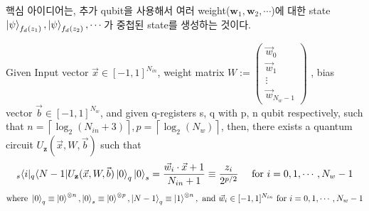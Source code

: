 핵심 아이디어는, 추가 qubit을 사용해서 여러 weight($\mathbf{w}_1, \mathbf{w}_2, \cdots$)에 대한 state \( \ket{\psi}_{f_d(z_1)}, \ket{\psi}_{f_d(z_2)}, \cdots \)가 중첩된 state를 생성하는 것이다.

\begin{lemma}
Given Input vector \( \vec{x} \in [-1, 1]^{N_{in}} \), weight matrix \( W:= \begin{pmatrix}
    \vec{w}_0 \\ \vec{w}_1 \\ \vdots \\ \vec{w}_{N_w - 1}
\end{pmatrix} \) , bias vector \( \vec{b} \in [-1, 1]^{N_w} \), and given q-registers s, q with p, n qubit respectively, such that \( n = \left\lceil \log_2(N_{in} + 3) \right\rceil, p = \left\lceil \log_2(N_w) \right\rceil \), then, there exists a quantum circuit \( U_{\mathbf z}(\vec{x}, W, \vec{b}) \) such that
\[
    {}_{s}\langle{i}| {}_{q}\langle N-1|U_{\mathbf z}(\vec{x}, W, \vec{b})\ket{0}_q \ket{0}_s = {\vec{w}_i \cdot {\vec{x} + 1} \over {N_{in} + 1}} \equiv {z_i \over {{2^{p/2}}}} \quad \text{ for } i = 0, 1, \cdots , N_{w} - 1
\]
\begin{gather*}
    \text{where } \ket{0}_q \equiv \ket{0}^{\otimes n}, \ket{0}_s \equiv \ket{0}^{\otimes p}, \ket{N-1}_q \equiv \ket{1}^{\otimes n},\text{ and } \vec{w}_i \in [-1, 1]^{N_{in}} \text{ for } i = 0, 1, \cdots, N_w - 1
\end{gather*}


\end{lemma}
